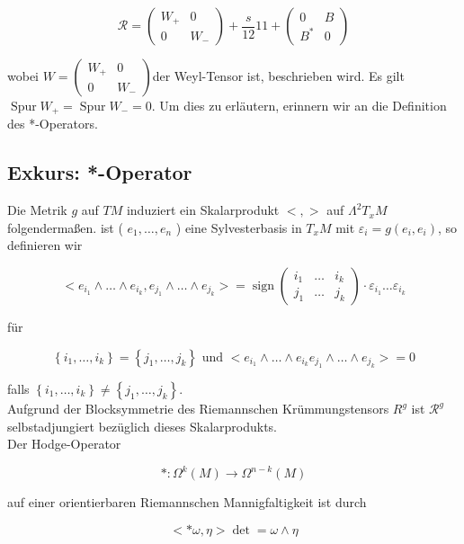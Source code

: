 \documentclass[10pt, letterpaper]{article}
\begin{document}
$$
\mathcal{R}=\left(\begin{array}{cc}
W_{+} & 0 \\
0 & W_{-}
\end{array}\right)+\frac{s}{12} 11+\left(\begin{array}{cc}
0 & B \\
B^{*} & 0
\end{array}\right)
$$

wobei $W=\left(\begin{array}{cc}W_{+} & 0 \\ 0 & W_{-}\end{array}\right)$der Weyl-Tensor ist, beschrieben wird. Es gilt $\operatorname{Spur} W_{+}=\operatorname{Spur} W_{-}=0$. Um dies zu erläutern, erinnern wir an die Definition des *-Operators.

\subsection*{Exkurs: *-Operator}
Die Metrik $g$ auf $T M$ induziert ein Skalarprodukt $<,>$ auf $\Lambda^{2} T_{x} M$ folgendermaßen. ist ( $e_{1}, \ldots, e_{n}$ ) eine Sylvesterbasis in $T_{x} M$ mit $\varepsilon_{i}=g\left(e_{i}, e_{i}\right)$, so definieren wir

$$
<e_{i_{1}} \wedge \ldots \wedge e_{i_{k}}, e_{j_{1}} \wedge \ldots \wedge e_{j_{k}}>=\operatorname{sign}\left(\begin{array}{ccc}
i_{1} & \ldots & i_{k} \\
j_{1} & \ldots & j_{k}
\end{array}\right) \cdot \varepsilon_{i_{1}} \ldots \varepsilon_{i_{k}}
$$

für

$$
\left\{i_{1}, \ldots, i_{k}\right\}=\left\{j_{1}, \ldots, j_{k}\right\} \text { und }<e_{i_{1}} \wedge \ldots \wedge e_{i_{k}} e_{j_{1}} \wedge \ldots \wedge e_{j_{k}}>=0
$$

falls $\left\{i_{1}, \ldots, i_{k}\right\} \neq\left\{j_{1}, \ldots, j_{k}\right\}$.\\
Aufgrund der Blocksymmetrie des Riemannschen Krümmungstensors $R^{g}$ ist $\mathcal{R}^{g}$ selbstadjungiert bezüglich dieses Skalarprodukts.\\
Der Hodge-Operator

$$
*: \Omega^{k}(M) \rightarrow \Omega^{n-k}(M)
$$

auf einer orientierbaren Riemannschen Mannigfaltigkeit ist durch

$$
<* \omega, \eta>\operatorname{det}=\omega \wedge \eta
$$
\end{document}
